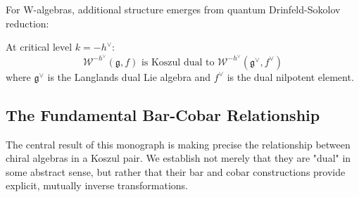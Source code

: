 For W-algebras, additional structure emerges from quantum Drinfeld-Sokolov reduction:

\begin{theorem}
At critical level $k = -h^\vee$:
$$\mathcal{W}^{-h^\vee}(\mathfrak{g}, f) \text{ is Koszul dual to } \mathcal{W}^{-h^\vee}(\mathfrak{g}^\vee, f^\vee)$$
where $\mathfrak{g}^\vee$ is the Langlands dual Lie algebra and $f^\vee$ is the dual nilpotent element.
\end{theorem}

\subsection{The Fundamental Bar-Cobar Relationship}

The central result of this monograph is making precise the relationship between chiral algebras in a Koszul pair. We establish not merely that they are "dual" in some abstract sense, but rather that their bar and cobar constructions provide explicit, mutually inverse transformations.

